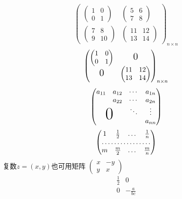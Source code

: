 \documentclass{ctexart}	%
\begin{document}
	\[
	\begin{pmatrix}
		\begin{pmatrix}
			1&0\\0&1
		\end{pmatrix} &
		\begin{pmatrix}
			5&6\\7&8
		\end{pmatrix}  \\
		\begin{pmatrix}
			7&8\\9&10
		\end{pmatrix} &
		\begin{pmatrix}
			11&12\\13&14
		\end{pmatrix}
	\end{pmatrix}_{n \times n}
	\]
	\[
	\begin{pmatrix}
		\begin{pmatrix}
		1&0\\0&1
		\end{pmatrix} &
		\text{\Large 0} \\	%
		\text{\Large 0} &
		\begin{pmatrix}
		11&12\\13&14
		\end{pmatrix}
	\end{pmatrix}_{n \times n}
	\]
	\[
	\begin{pmatrix}
	a_{11}&a_{12}&\cdots&a_{1n}\\
	&a_{22}&\cdots&a_{2n}\\
	&	&\ddots&\vdots\\
	\multicolumn{2}{c}{\raisebox{1.3ex}[0pt]{\Huge 0}}%
	&                    &a_{nn}
	\end{pmatrix}
	\]
	\[
		\begin{pmatrix}
			1&\frac{1}{2}&\dots&\frac{1}{n}\\
			\hdotsfor{4}\\%
			m&\frac{m}{2}&\dots&\frac{m}{n}
		\end{pmatrix}
	\]
	复数$z=(x,y)$也可用矩阵
	\begin{math}
		\left(%
		\begin{smallmatrix}
		x&-y\\y&x
		\end{smallmatrix}
		\right)%
	\end{math}
	\[
	\begin{array}{r|r}%
	\frac{1}{2} & 0\\
	\hline%
	0&-\frac{a}{bc}\\
	\end{array}
	\]
	
	
	
	
\end{document}
